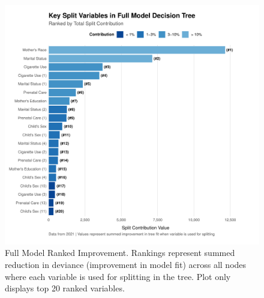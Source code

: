 
\begin{figure}[H]
    \centering
    \includegraphics[width=1\linewidth]{chapters/chapter3/figures/improvement/tree_split_contribution_top20_Full Model.pdf}
    \caption{Full Model Ranked Improvement. Rankings represent summed reduction in deviance (improvement in model fit) across all nodes where each variable is used for splitting in the tree. Plot only displays top 20 ranked variables.}
    \label{fig:full-model-ranked-imp}
\end{figure}

